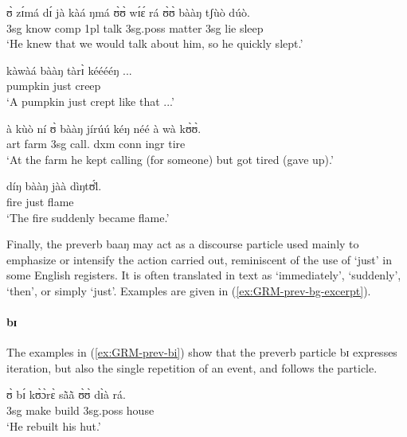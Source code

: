 \begin{exe}
\begin{exe}
\begin{exe}
\begin{exe}
\begin{exe}
\begin{exe}
\begin{exe}
\begin{exe}
\begin{exe}
\begin{exe}
\begin{exe}
\begin{exe}
 \ea\label{ex:GRM-prev-bg-excerpt}
\ea\label{ex:FUS-mod}
\gll  ʊ̀ zɪ́má dɪ́ jà kàá ŋmá ʊ̀ʊ̀ wɪ́ɛ́ rá ʊ̀ʊ̀ bààŋ tʃùò dúò.\\
 {\sc 3sg}  know {\sc comp}  {\sc 1pl}  {\fut} talk   {\sc 3sg.poss} matter 
{\foc} {\sc 3sg} {\mod} lie sleep\\
\glt  `He knew that we would talk about him, so he quickly slept.'

\ex
\gll kàwàá bààŋ tàrɪ̀ kééééŋ ...\\
pumpkin just creep {\dxm}\\
\glt `A pumpkin just crept like that ...' 

\ex
\gll à kùò ní ʊ̀ bààŋ jírúú kéŋ néé à wà kʊ̀ʊ̀.\\
{\sc art} farm {\postp}  {\sc 3sg} {\mod} call.{\ipfv} {\sc dxm} {\foc} {\sc 
conn} {\sc ingr} tire\\
\glt `At the farm he kept calling (for someone) but got tired (gave up).'


\ex
\gll díŋ bààŋ jàà dìŋtʊ́l̀.\\
fire  just {\ident} flame\\
\glt `The fire suddenly became flame.'

 \z 
 \z

 Finally, the preverb  {\sls baaŋ} may act as a discourse particle used mainly to emphasize or intensify the action carried out, reminiscent of  the use of 
`just' 
in some English registers.  It is often translated in text as `immediately', 
`suddenly', `then',  or simply `just'. Examples are given in 
(\ref{ex:GRM-prev-bg-excerpt}).


\paragraph{bɪ}
\label{sec:GRM-preverb-iteration}

The examples in (\ref{ex:GRM-prev-bi}) show that  the preverb particle {\sls bɪ}
expresses  iteration, but also the single repetition of an event, and follows the  particle. 



\ea\label{ex:GRM-prev-bi}

\ea\label{ex:vp33.2.}
\gll ʊ̀ bɪ́ kʊ̀ɔ̀rɛ̀ sã̀ã̀ ʊ̀ʊ̀ dɪ̀à rá.\\
 {\sc 3sg}  {\itr} make build {\sc 3sg.poss} house {\foc}\\
\glt  `He rebuilt his hut.' 


\end{exe}
\end{exe}
\end{exe}
\end{exe}
\end{exe}
\end{exe}
\end{exe}
\end{exe}
\end{exe}
\end{exe}
\end{exe}
\end{exe}
